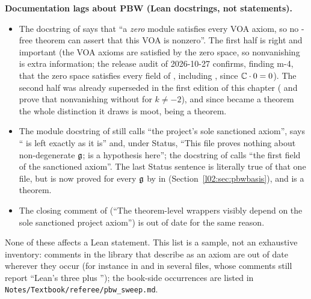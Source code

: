 \begin{warning}
\textbf{Documentation lags about PBW (Lean docstrings, not statements).}
\begin{itemize}
\item The docstring of  says that ``a \emph{zero} module
  satisfies every VOA axiom, so no -free theorem can assert that this VOA is nonzero''. The first
  half is right and important (the VOA axioms are satisfied by the zero space, so nonvanishing is extra
  information; the release audit of 2026-10-27 confirms, finding m-4, that the zero space satisfies every field of
  , including , since ${\mathbb{C}}\cdot 0 = 0$). The second half was already superseded in the first edition of this chapter
  (\allowbreak{}\allowbreak{}\allowbreak{} and \allowbreak{}\allowbreak{} prove
  that nonvanishing without  for $k\ne-2$), and since  became a theorem the whole distinction it draws
  is moot,  being a theorem.
\item The module docstring of  still calls  ``the
  project's sole sanctioned axiom'', says `` is left exactly as it is'' and, under Status,
  ``This file proves nothing about non-degenerate $\mathfrak{g}$;  is a hypothesis here''; the
  docstring of \allowbreak{}\allowbreak{} calls  ``the first field of the
  sanctioned axiom''. The last Status sentence is literally true of that one file, but  is
  now proved for every $\mathfrak{g}$ by  in 
  (Section~\ref{l02:sec:pbwbasis}), and  is a theorem.
\item The closing comment of  (``The theorem-level
  wrappers visibly depend on the sole sanctioned project axiom'') is out of date for the same reason.
\end{itemize}
None of these affects a Lean statement. This list is a sample, not an exhaustive inventory: comments in
the library that describe  as an axiom are out of date wherever they occur (for instance in
 and in several  files, whose comments still
report ``Lean's three plus ''); the book-side occurrences are listed in
\texttt{Notes/Textbook/referee/pbw\_sweep.md}.
\end{warning}

